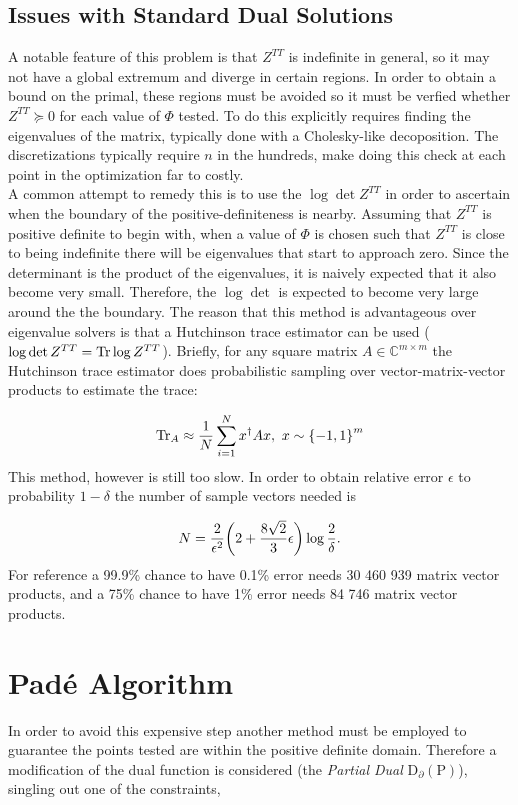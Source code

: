 \documentclass[reprint]{revtex4-2}
\begin{document}
\subsection{Issues with Standard Dual Solutions}
\label{ssec:formulation}
A notable feature of this problem is that $Z^{TT}$ is indefinite in general, so it may not have a global extremum and diverge in certain regions. In order to obtain a bound on the primal, these regions must be avoided so it must be verfied whether $Z^{TT}\succcurlyeq 0$ for each value of $\Phi$ tested. To do this explicitly requires finding the eigenvalues of the matrix, typically done with a Cholesky-like decoposition. The discretizations typically require $n$ in the hundreds, make doing this check at each point in the optimization far to costly.\\

A common attempt to remedy this is to use the $\log\det Z^{TT}$ in order to ascertain when the boundary of the positive-definiteness is nearby. Assuming that $Z^{TT}$ is positive definite to begin with, when a value of $\Phi$ is chosen such that $Z^{TT}$ is close to being indefinite there will be eigenvalues that start to approach zero. Since the determinant is the product of the eigenvalues, it is naively expected that it also become very small. Therefore, the $\log\det$ is expected to become very large around the the boundary. The reason that this method is advantageous over eigenvalue solvers is that a Hutchinson trace estimator can be used ($\log\det Z^{TT} = \Tr\log Z^{TT}$). Briefly, for any square matrix $A\in\mathbb{C}^{m\times m}$ the Hutchinson trace estimator does probabilistic sampling over vector-matrix-vector products to estimate the trace:

\begin{align}
	\Tr_A\approx\frac{1}{N}\sum_{i=1}^N x^\dagger Ax,\ x\sim\qty{-1, 1}^m
\end{align}
This method, however is still too slow. In order to obtain relative error $\epsilon$ to probability $1-\delta$ the number of sample vectors needed is \cite{skorski2021modern}

\begin{align}
	N = \frac{2}{\epsilon^2}\qty(2+\frac{8\sqrt{2}}{3}\epsilon)\log\frac{2}{\delta}.
\end{align}
For reference a 99.9\% chance to have 0.1\% error needs 30 460 939 matrix vector products, and a 75\% chance to have 1\% error needs 84 746 matrix vector products.
\section{Padé Algorithm}
\label{sec:algorithm}
In order to avoid this expensive step another method must be employed to guarantee the points tested are within the positive definite domain. Therefore a modification of the dual function is considered (the \emph{Partial Dual} $\text{D}_\partial(\text{P})$), singling out one of the constraints,
\end{document}
